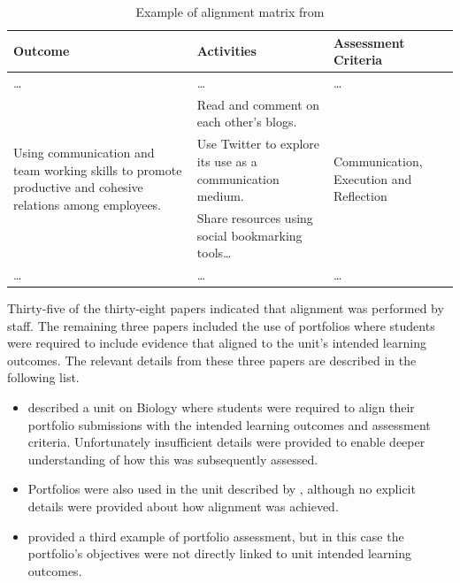 \begin{table}[p]
	\centering
	\caption{Example of alignment matrix from \citet{terrell2011using}}
	\label{tbl:example_matrix}
	\footnotesize
    \begin{tabular}{p{4cm}|p{5cm}|p{3cm}}
     \textbf{Outcome} & \textbf{Activities} & \textbf{Assessment Criteria} \\ \hline
     \ldots & \ldots & \ldots \\
	\multirow{3}{4cm}{Using communication and team working skills to promote productive and cohesive relations among employees.} & 
	Read and comment on each other's blogs. & \multirow{3}{3cm}{Communication, Execution and Reflection} \\
	& Use Twitter to explore its use as a communication medium.
	&  \\
	& Share resources using social bookmarking tools\ldots & \\
	\ldots & \ldots & \ldots \\
    \end{tabular}
\end{table}

Thirty-five of the thirty-eight papers indicated that alignment was performed by staff. The remaining three papers included the use of portfolios where students were required to include evidence that aligned to the unit's intended learning outcomes. The relevant details from these three papers are described in the following list.

\begin{itemize}[noitemsep,nolistsep]
	\item \citet{hoddinott2000biggs} described a unit on Biology where students were required to align their portfolio submissions with the intended learning outcomes and assessment criteria. Unfortunately insufficient details were provided to enable deeper understanding of how this was subsequently assessed.
	\item Portfolios were also used in the unit described by \citet{scott2009promoting}, although no explicit details were provided about how alignment was achieved. 
	\item \citet{Tang:1999} provided a third example of portfolio assessment, but in this case the portfolio's objectives were not directly linked to unit intended learning outcomes.
\end{itemize}





